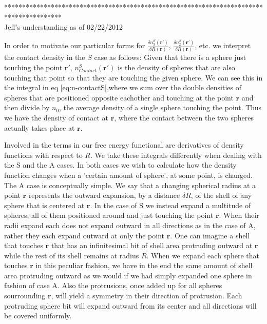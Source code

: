 \documentclass[letterpaper,twocolumn,amsmath,amssymb,jcp,10pt,aip]{revtex4-1}
\begin{document}
{  
****************************************************************************************\\
Jeff's understanding as of 02/22/2012


  In order to motivate our particular forms for $\frac{\delta n_3^{S} (\mathbf{r}')}{\delta R(\mathbf{r})}$, $\frac{\delta n_2^{S}(\mathbf{r}')}{\delta R(\mathbf{r})}$, etc. we interpret the contact density in the $S$ case as follows: 
  Given that there is a sphere just touching the point $\mathbf{r}'$, $n_{Contact}^{S}(\mathbf{r}')$ is the density
  of spheres that are also touching that point so that they are touching the given sphere.  We can see this in the integral in eq \ref{eq:n-contactS},where we sum over the double densities of spheres that are positioned opposite eachother and touching at the point $\mathbf{r}$ and then divide
  by $n_0$, the average density of a single sphere touching the point.  Thus we have the density of contact at $\mathbf{r}$, where the
  contact between the two spheres actually takes place at $\mathbf{r}$.

Involved in the terms in our free energy functional are derivatives of density functions with respect to $R$.  We take these integrals differently when dealing with the S and the A cases. In both cases we wish to calculate how the density function changes when a 'certain amount of sphere', at some point, is changed.  The A case is conceptually simple.  We say that a changing spherical radius at a point $\mathbf{r}$ represents the outward expansion, by a distance $\delta R$, of the shell of any sphere that is centered at $\mathbf{r}$.  In the case of S we instead expand a multitude of spheres, all of them positioned around and just touching the point $\mathbf{r}$.  When their radii expand each does not expand outward in all directions as in the case of A, rather they each expand outward at only the point $\mathbf{r}$.  One can imagine a shell that touches $\mathbf{r}$ that has an infinitesimal bit of shell area protruding outward at $\mathbf{r}$ while the rest of its shell remains at radius $R$.  When we expand each sphere that touches $\mathbf{r}$ in this peculiar fashion, we have in the end the same amount of shell area protruding outward as we would if we had simply expanded one sphere in fashion of case A.  Also the protrusions, once added up for all spheres sourrounding $\mathbf{r}$, will yield a symmetry in their direction of protrusion.  Each protruding sphere bit will expand outward from its center and all directions will be covered uniformly.  



}
\end{document}
